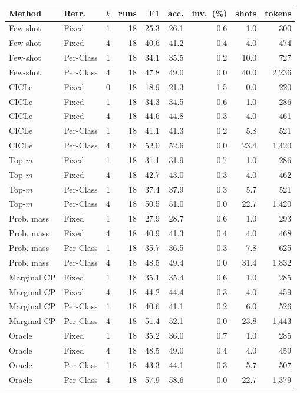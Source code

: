 \begin{tabular}{llrrrrrrr}
\toprule
Method & Retr. & $k$ & runs & F1 & acc. & inv.\ (\%) & shots & tokens \\
\midrule
Few-shot & Fixed & 1 & 18 & 25.3 & 26.1 & 0.6 & 1.0 & 300 \\
Few-shot & Fixed & 4 & 18 & 40.6 & 41.2 & 0.4 & 4.0 & 474 \\
Few-shot & Per-Class & 1 & 18 & 34.1 & 35.5 & 0.2 & 10.0 & 727 \\
Few-shot & Per-Class & 4 & 18 & 47.8 & 49.0 & 0.0 & 40.0 & 2,236 \\
CICLe & Fixed & 0 & 18 & 18.9 & 21.3 & 1.5 & 0.0 & 220 \\
CICLe & Fixed & 1 & 18 & 34.3 & 34.5 & 0.6 & 1.0 & 286 \\
CICLe & Fixed & 4 & 18 & 44.6 & 44.8 & 0.3 & 4.0 & 461 \\
CICLe & Per-Class & 1 & 18 & 41.1 & 41.3 & 0.2 & 5.8 & 521 \\
CICLe & Per-Class & 4 & 18 & 52.0 & 52.6 & 0.0 & 23.4 & 1,420 \\
\midrule
Top-$m$ & Fixed & 1 & 18 & 31.1 & 31.9 & 0.7 & 1.0 & 286 \\
Top-$m$ & Fixed & 4 & 18 & 42.7 & 43.0 & 0.3 & 4.0 & 462 \\
Top-$m$ & Per-Class & 1 & 18 & 37.4 & 37.9 & 0.3 & 5.7 & 521 \\
Top-$m$ & Per-Class & 4 & 18 & 50.5 & 51.0 & 0.0 & 22.7 & 1,420 \\
Prob. mass & Fixed & 1 & 18 & 27.9 & 28.7 & 0.6 & 1.0 & 293 \\
Prob. mass & Fixed & 4 & 18 & 40.9 & 41.3 & 0.4 & 4.0 & 468 \\
Prob. mass & Per-Class & 1 & 18 & 35.7 & 36.5 & 0.3 & 7.8 & 625 \\
Prob. mass & Per-Class & 4 & 18 & 48.5 & 49.4 & 0.0 & 31.4 & 1,832 \\
Marginal CP & Fixed & 1 & 18 & 35.1 & 35.4 & 0.6 & 1.0 & 285 \\
Marginal CP & Fixed & 4 & 18 & 44.2 & 44.4 & 0.3 & 4.0 & 459 \\
Marginal CP & Per-Class & 1 & 18 & 40.6 & 41.1 & 0.2 & 6.0 & 526 \\
Marginal CP & Per-Class & 4 & 18 & 51.4 & 52.1 & 0.0 & 23.8 & 1,443 \\
Oracle & Fixed & 1 & 18 & 35.2 & 36.0 & 0.7 & 1.0 & 285 \\
Oracle & Fixed & 4 & 18 & 48.5 & 49.0 & 0.4 & 4.0 & 459 \\
Oracle & Per-Class & 1 & 18 & 43.3 & 44.1 & 0.3 & 5.7 & 507 \\
Oracle & Per-Class & 4 & 18 & 57.9 & 58.6 & 0.0 & 22.7 & 1,379 \\
\bottomrule
\end{tabular}
